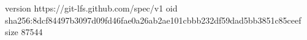 version https://git-lfs.github.com/spec/v1
oid sha256:8dcf84497b3097d09fd46fae0a26ab2ae101cbbb232df59dad5bb3851c85ceef
size 87544

